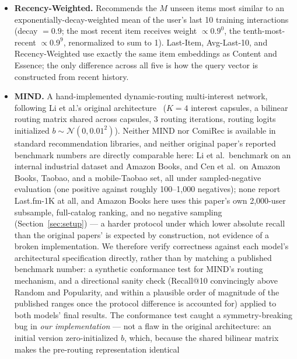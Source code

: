 \documentclass[11pt,a4paper]{article}
\begin{document}
\begin{itemize}[leftmargin=*, itemsep=3pt]
        to the uniform mean embedding of the user's last 10 training
        interactions.
  \item \textbf{Recency-Weighted.} Recommends the $M$ unseen items most
        similar to an exponentially-decay-weighted mean of the user's last
        10 training interactions (decay $=0.9$; the most recent item
        receives weight $\propto 0.9^{0}$, the tenth-most-recent
        $\propto 0.9^{9}$, renormalized to sum to 1). Last-Item,
        Avg-Last-10, and Recency-Weighted use exactly the same item
        embeddings as Content and Essence; the only difference across all
        five is how the query vector is constructed from recent history.
  \item \textbf{MIND.} A hand-implemented dynamic-routing multi-interest
        network, following Li et al.'s original architecture~\cite{li2019}
        ($K=4$ interest capsules, a bilinear routing matrix shared across
        capsules, 3 routing iterations, routing logits initialized
        $b \sim \mathcal{N}(0, 0.01^2)$). Neither MIND nor ComiRec is
        available in standard recommendation libraries, and neither
        original paper's reported benchmark numbers are directly
        comparable here: Li et al.\ benchmark on an internal industrial
        dataset and Amazon Books, and Cen et al.\ on Amazon Books, Taobao,
        and a mobile-Taobao set, all under sampled-negative evaluation
        (one positive against roughly 100--1{,}000 negatives); none report
        Last.fm-1K at all, and Amazon Books here uses this paper's own
        2{,}000-user subsample, full-catalog ranking, and no negative
        sampling (Section~\ref{sec:setup}) --- a harder protocol under
        which lower absolute recall than the original papers' is expected
        by construction, not evidence of a broken implementation. We
        therefore verify correctness against each model's architectural
        specification directly, rather than by matching a published
        benchmark number: a synthetic conformance test for MIND's routing
        mechanism, and a directional sanity check (Recall@10 convincingly
        above Random and Popularity, and within a plausible order of
        magnitude of the published ranges once the protocol difference is
        accounted for) applied to both models' final results. The
        conformance test caught a symmetry-breaking bug in \emph{our
        implementation} --- not a flaw in the original architecture: an
        initial version zero-initialized $b$, which, because the shared
        bilinear matrix makes the pre-routing representation identical

\end{itemize}
\end{document}
